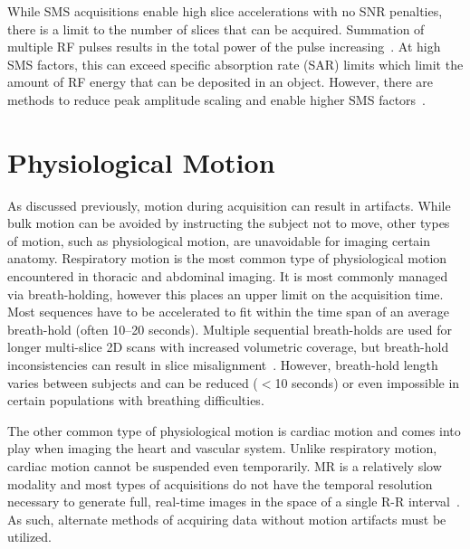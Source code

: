 While SMS acquisitions enable high slice accelerations with no SNR penalties, there is a limit to the number of slices that can be acquired. Summation of multiple RF pulses results in the total power of the pulse increasing~\cite{barthSimultaneousMultisliceSMS2016a}. At high SMS factors, this can exceed specific absorption rate (SAR) limits which limit the amount of RF energy that can be deposited in an object. However, there are methods to reduce peak amplitude scaling and enable higher SMS factors~\cite{aboseadaOptimizedAmplitudeModulated2017a, conollyVariablerateSelectiveExcitation1988}.

\section{Physiological Motion}\label{sec:gating}
As discussed previously, motion during acquisition can result in artifacts. While bulk motion can be avoided by instructing the subject not to move, other types of motion, such as physiological motion, are unavoidable for imaging certain anatomy. Respiratory motion is the most common type of physiological motion encountered in thoracic and abdominal imaging. It is most commonly managed via breath-holding, however this places an upper limit on the acquisition time. Most sequences have to be accelerated to fit within the time span of an average breath-hold (often 10--20 seconds). Multiple sequential breath-holds are used for longer multi-slice 2D scans with increased volumetric coverage, but breath-hold inconsistencies can result in slice misalignment~\cite{chandlerCorrectionMisalignedSlices2008}. However, breath-hold length varies between subjects and can be reduced ($<$10 seconds) or even impossible in certain populations with breathing difficulties.

The other common type of physiological motion is cardiac motion and comes into play when imaging the heart and vascular system. Unlike respiratory motion, cardiac motion cannot be suspended even temporarily. MR is a relatively slow modality and most types of acquisitions do not have the temporal resolution necessary to generate full, real-time images in the space of a single R-R interval~\cite{nayakTriggeredRealtimeMRI2003}. As such, alternate methods of acquiring data without motion artifacts must be utilized.

